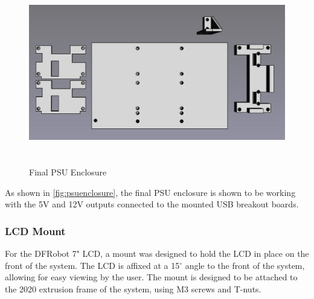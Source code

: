 \begin{figure}[H]
    \begin{minipage}[h]{0.95\textwidth}
        \centering
        \includegraphics[height=8cm]{imgs/freecad/psu_mount.jpg}
        \caption{Final PSU Enclosure}
        \label{fig:psuenclosure}
    \end{minipage}
\end{figure}

As shown in \autoref{fig:psuenclosure}, the final PSU enclosure is shown to be working with the 5V and 12V outputs connected to the mounted USB breakout boards.

\subsubsection{LCD Mount}
\label{sec:lcd-mount}
For the DFRobot 7" LCD, a mount was designed to hold the LCD in place on the front of the system. The LCD is affixed at a 15$^{\circ}$ angle to the front of the system, allowing for easy viewing by the user. The mount is designed to be attached to the 2020 extrusion frame of the system, using M3 screws and T-nuts.

